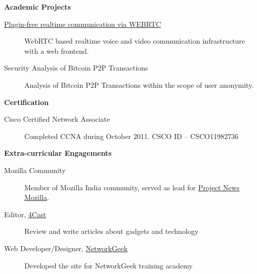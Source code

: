 \documentclass[letterpaper,11pt]{article}
\newcommand{\resheading}[1]{{\large \colorbox{mygrey}{\begin{minipage}{\textwidth}{\textbf{#1 \vphantom{p\^{E}}}}\end{minipage}}}}
\begin{document}
\newpage

\resheading{{Academic Projects}}

\begin{description}
\item[\href{https://github.com/dtsdwarak/webrtc-signal}{Plugin-free realtime communication via WEBRTC}] { \footnotesize WebRTC based realtime voice and video communication infrastructure with a web frontend.}

\item[{Security Analysis of Bitcoin P2P Transactions}] { \footnotesize Analysis of Bitcoin P2P Transactions within the scope of user anonymity.}

\end{description}

\resheading{Certification}
\begin{description}

\item[Cisco Certified Network Associate] { \footnotesize Completed CCNA during October 2011. CSCO ID – CSCO11982736}

\end{description}

\resheading{Extra-curricular Engagements} 

	\begin{description}
		\item[Mozilla Community] {\footnotesize Member of Mozilla India community, served as lead for \href{https://wiki.mozilla.org/NeMo}{Project News Mozilla}.}
		\item[Editor, \href{http://www.the4cast.com/author/dwarak}{4Cast}] {\footnotesize Review and write articles about gadgets and technology}
		\item[Web Developer/Designer, \href{http://networkgeek.in/}{NetworkGeek}] {\footnotesize Developed the site for NetworkGeek training academy}
	\end{description}
\end{document}
